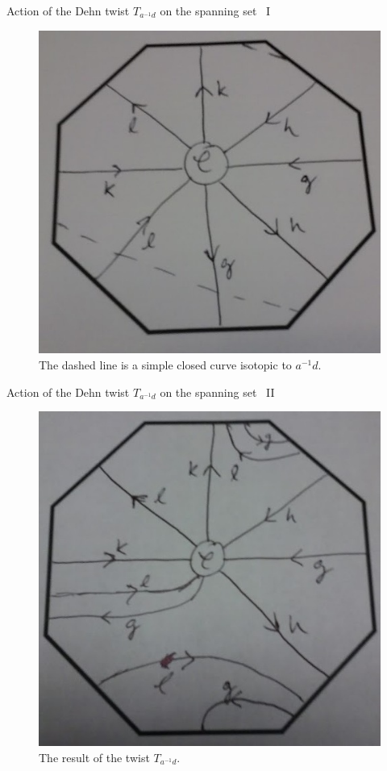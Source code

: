\documentclass{beamer}
\begin{document}
\begin{frame}{Action of the Dehn twist $T_{a^{-1}d}$ on the spanning set \, I}
\begin{figure}[h]
\centering
\includegraphics[height=0.7\textheight]{5.jpeg}
\caption{The dashed line is a simple closed curve isotopic to $a^{-1}d$.}
\end{figure}
\end{frame}


\begin{frame}{Action of the Dehn twist $T_{a^{-1}d}$ on the spanning set \, II}
\begin{figure}[h]
\centering
\includegraphics[height=0.7\textheight]{7.jpeg}
\caption{The result of the twist $T_{a^{-1}d}$.}
\end{figure}
\end{frame}
\end{document}
